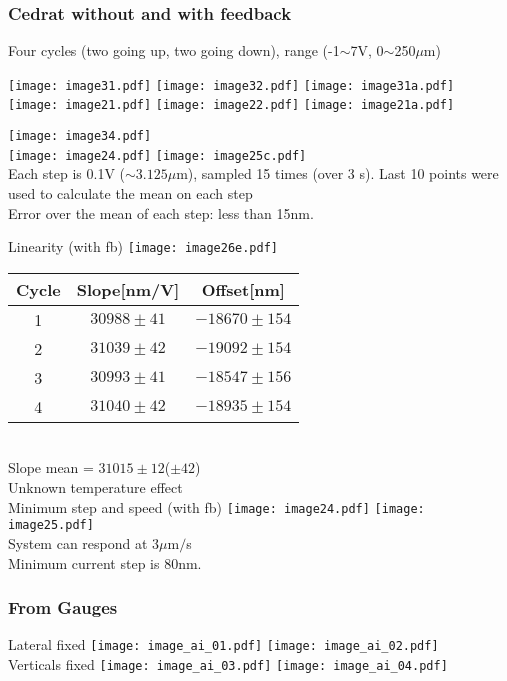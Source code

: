 \subsubsection{Cedrat without and with feedback}
Four cycles (two going up, two going down), range (-1$\sim$7V, 0$\sim$250$\mu$m)\par
\texttt{[image: image31.pdf]}
\texttt{[image: image32.pdf]}
\texttt{[image: image31a.pdf]}\\
\texttt{[image: image21.pdf]}
\texttt{[image: image22.pdf]}
\texttt{[image: image21a.pdf]}\par
 \texttt{[image: image34.pdf]}\\
 \texttt{[image: image24.pdf]}
 \texttt{[image: image25c.pdf]}\\
{\tiny Each step is 0.1V ($\sim3.125\mu$m), sampled 15 times (over 3 s).}
{\tiny Last 10 points were used to calculate the mean on each step\\Error over the mean of each step: less than 15nm.}\par

Linearity (with fb)
\texttt{[image: image26e.pdf]}
\begin{tabular}[]{|c|c|c|}\hline
 Cycle & Slope[nm/V] & Offset[nm] \\\hline
 {\color{red}1} & $30988 \pm 41$& $-18670\pm154$\\
{\color{green}2} & $31039 \pm 42$& $-19092\pm154$ \\
{\color{blue}3} & $30993\pm 41$& $-18547\pm156$\\
{\color{magenta}4} & $31040 \pm42$ & $-18935\pm154$\\\hline
\end{tabular}\\Slope mean = $31015\pm12$($\pm42$)\\Unknown temperature effect\\
Minimum step and speed (with fb)
\texttt{[image: image24.pdf]}
\texttt{[image: image25.pdf]}\\
System can respond at 3$\mu$m$/$s\\
Minimum current step is 80nm.

\subsubsection{From Gauges}
Lateral fixed
 \texttt{[image: image\_ai\_01.pdf]}
 \texttt{[image: image\_ai\_02.pdf]}\\
Verticals fixed
 \texttt{[image: image\_ai\_03.pdf]}
 \texttt{[image: image\_ai\_04.pdf]}\\ 

